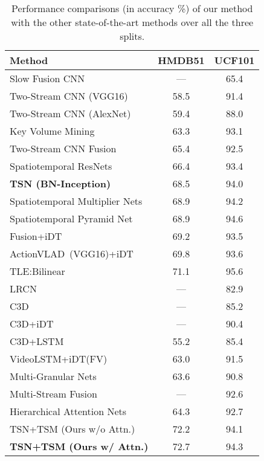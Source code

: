 \documentclass[english, 10pt, twocolumn, twoside]{IEEEtran}
\begin{document}
\begin{table}[h]
\caption{Performance comparisons (in accuracy \%) of our method with the other state-of-the-art methods over all the three splits.}
\label{tab:statoftheart}
 \fontsize{9pt}{10pt}\selectfont\centering
   \begin{center}
     \begin{tabular}{|l|c|c|}
       \hline
       Method & HMDB51 & UCF101 \\
       \hline\hline
       Slow Fusion CNN~\cite{karpathy2014large} & --- & 65.4 \\				
       Two-Stream CNN (VGG16)~\cite{feichtenhofer2016convolutional} & 58.5 & 91.4 \\				
       Two-Stream CNN (AlexNet)~\cite{simonyan2014two} & 59.4 & 88.0 \\
       Key Volume Mining~\cite{zhu2016key} & 63.3 & 93.1 \\

       Two-Stream CNN Fusion~\cite{feichtenhofer2016convolutional} & 65.4 & 92.5 \\
               Spatiotemporal ResNets~\cite{feichtenhofer2016spatiotemporal} & 66.4 & 93.4 \\
       \textbf{TSN (BN-Inception)}~\cite{wang2016temporal} & 68.5 & 94.0 \\			
       Spatiotemporal Multiplier Nets~\cite{feichtenhofer2017spatiotemporal} & 68.9 & 94.2 \\
       Spatiotemporal Pyramid Net~\cite{wang2017spatiotemporal} & 68.9 & 94.6 \\
               Fusion+iDT~\cite{feichtenhofer2016convolutional} & 69.2 & 93.5 \\	
       ActionVLAD~(VGG16)+iDT~\cite{Girdhar2017ActionVLAD} & 69.8 & 93.6 \\               			
       TLE:Bilinear~\cite{diba2016deep} & 71.1 & 95.6 \\
\hline
       LRCN~\cite{donahue2015long} & --- & 82.9 \\
       C3D~\cite{tran2015learning} & --- & 85.2 \\
       C3D+iDT~\cite{tran2015learning} & --- & 90.4 \\
       C3D+LSTM~\cite{Ye2016Embedding} & 55.2 & 85.4 \\

         VideoLSTM+iDT(FV)~\cite{li2016videolstm} & 63.0 & 91.5 \\
       Multi-Granular Nets~\cite{li2016action} & 63.6 & 90.8 \\
Multi-Stream Fusion~\cite{wu2016multi} & --- & 92.6 \\			
       Hierarchical Attention Nets~\cite{wang2016hierarchical} & 64.3 & 92.7 \\


       \hline \hline
     TSN+TSM (Ours w/o Attn.) & 72.2 & 94.1 \\
     \textbf{TSN+TSM (Ours w/ Attn.)} & 72.7 & 94.3 \\
       \hline
     \end{tabular}
   \end{center}
\vspace{-4mm}
\end{table}
\end{document}
